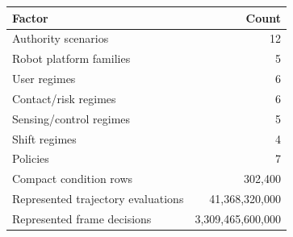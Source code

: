 \begin{tabular}{lr}
\toprule
Factor & Count \\
\midrule
Authority scenarios & 12 \\
Robot platform families & 5 \\
User regimes & 6 \\
Contact/risk regimes & 6 \\
Sensing/control regimes & 5 \\
Shift regimes & 4 \\
Policies & 7 \\
Compact condition rows & 302,400 \\
Represented trajectory evaluations & 41,368,320,000 \\
Represented frame decisions & 3,309,465,600,000 \\
\bottomrule
\end{tabular}
